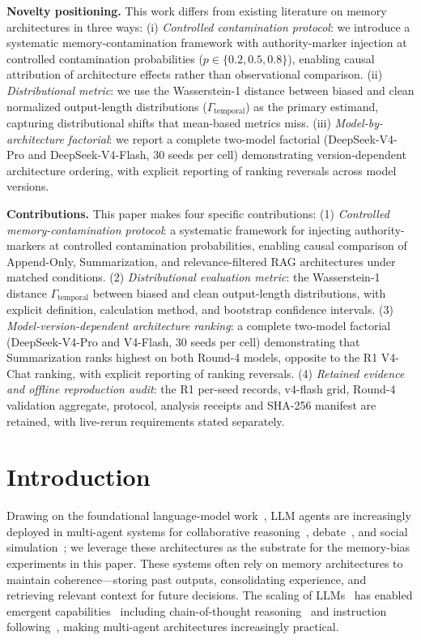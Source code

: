 \documentclass[11pt]{article}
\begin{document}


\textbf{Novelty positioning.} This work differs from existing literature on memory architectures in three ways: (i) \emph{Controlled contamination protocol}: we introduce a systematic memory-contamination framework with authority-marker injection at controlled contamination probabilities ($p \in \{0.2, 0.5, 0.8\}$), enabling causal attribution of architecture effects rather than observational comparison. (ii) \emph{Distributional metric}: we use the Wasserstein-1 distance between biased and clean normalized output-length distributions ($\Gamma_{\text{temporal}}$) as the primary estimand, capturing distributional shifts that mean-based metrics miss. (iii) \emph{Model-by-architecture factorial}: we report a complete two-model factorial (DeepSeek-V4-Pro and DeepSeek-V4-Flash, 30 seeds per cell) demonstrating version-dependent architecture ordering, with explicit reporting of ranking reversals across model versions.



\textbf{Contributions.} This paper makes four specific contributions: (1) \emph{Controlled memory-contamination protocol}: a systematic framework for injecting authority-markers at controlled contamination probabilities, enabling causal comparison of Append-Only, Summarization, and relevance-filtered RAG architectures under matched conditions. (2) \emph{Distributional evaluation metric}: the Wasserstein-1 distance $\Gamma_{\text{temporal}}$ between biased and clean output-length distributions, with explicit definition, calculation method, and bootstrap confidence intervals. (3) \emph{Model-version-dependent architecture ranking}: a complete two-model factorial (DeepSeek-V4-Pro and V4-Flash, 30 seeds per cell) demonstrating that Summarization ranks highest on both Round-4 models, opposite to the R1 V4-Chat ranking, with explicit reporting of ranking reversals. (4) \emph{Retained evidence and offline reproduction audit}: the R1 per-seed records, v4-flash grid, Round-4 validation aggregate, protocol, analysis receipts and SHA-256 manifest are retained, with live-rerun requirements stated separately.\section{Introduction}
\label{sec:intro}

Drawing on the foundational language-model work~\cite{brown2020language,touvron2023llama,zhao2023survey}, LLM agents are increasingly deployed in multi-agent systems for collaborative reasoning~\cite{du2024improving}, debate~\cite{li2023camel,liang2023multiagent}, and social simulation~\cite{park2023generative}; we leverage these architectures as the substrate for the memory-bias experiments in this paper. These systems often rely on memory architectures to maintain coherence---storing past outputs, consolidating experience, and retrieving relevant context for future decisions. The scaling of LLMs~\cite{kaplan2020scaling} has enabled emergent capabilities~\cite{wei2022emergent} including chain-of-thought reasoning~\cite{wei2022chain} and instruction following~\cite{ouyang2022training}, making multi-agent architectures increasingly practical.
\end{document}

